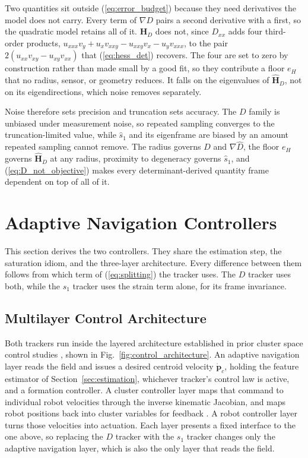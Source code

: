 \documentclass[lettersize,journal]{IEEEtran}
\begin{document}
Two quantities sit outside (\ref{eq:error_budget}) because they need
derivatives the model does not carry. Every term of $\nabla D$ pairs a
second derivative with a first, so the quadratic model retains all of it.
$\mathbf{H}_D$ does not, since $D_{xx}$ adds four third-order products,
$u_{xxx}v_y + u_x v_{xxy} - u_{xxy}v_x - u_y v_{xxx}$, to the pair
$2(u_{xx}v_{xy} - u_{xy}v_{xx})$ that (\ref{eq:hess_det}) recovers. The
four are set to zero by construction rather than made small by a good
fit, so they contribute a floor $e_H$ that no radius, sensor, or geometry
reduces. It falls on the eigenvalues of $\hat{\mathbf{H}}_D$, not on its
eigendirections, which noise removes separately.

Noise therefore sets precision and truncation sets accuracy. The $D$
family is unbiased under measurement noise, so repeated sampling
converges to the truncation-limited value, while $\hat{s}_1$ and its
eigenframe are biased by an amount repeated sampling cannot remove. The
radius governs $\hat{D}$ and $\nabla\hat{D}$, the floor $e_H$ governs
$\hat{\mathbf{H}}_D$ at any radius, proximity to degeneracy governs
$\hat{s}_1$, and (\ref{eq:D_not_objective}) makes every
determinant-derived quantity frame dependent on top of all of it.

\section{Adaptive Navigation Controllers}
\label{sec:controllers}

This section derives the two controllers. They share the estimation
step, the saturation idiom, and the three-layer architecture.
Every difference between them follows from which term of
(\ref{eq:splitting}) the tracker uses. The $D$ tracker uses both, while
the $s_1$ tracker uses the strain term alone, for its frame invariance.

\subsection{Multilayer Control Architecture}
\label{sec:arch}

Both trackers run inside the layered architecture established in prior
cluster space control studies \cite{3,4,9,36}, shown in
Fig.~\ref{fig:control_architecture}. An adaptive navigation layer reads
the field and issues a desired centroid velocity $\dot{\mathbf{p}}_c$,
holding the feature estimator of Section~\ref{sec:estimation}, whichever
tracker's control law is active, and a formation controller. A cluster
controller layer maps that command to individual robot velocities through
the inverse kinematic Jacobian, and maps robot positions back into
cluster variables for feedback \cite{36,37}. A robot controller layer
turns those velocities into actuation. Each layer presents a fixed
interface to the one above, so replacing the $D$ tracker with the $s_1$
tracker changes only the adaptive navigation layer, which is also the
only layer that reads the field.
\end{document}
